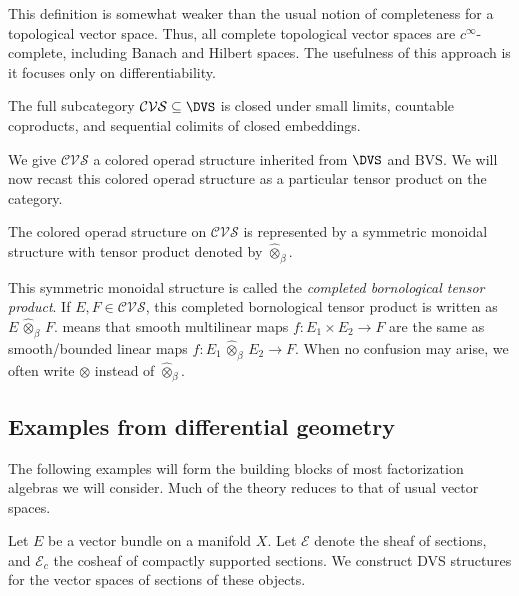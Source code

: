 This definition is somewhat weaker than the usual notion of completeness for a topological vector space. Thus, all complete topological vector spaces are $c^\infty $-complete, including Banach and Hilbert spaces. The usefulness of this approach is it focuses only on differentiability.

\begin{proposition}\label{prp:3-5-16}
	The full subcategory $\mathcal{CVS} \subseteq \DVS $ is closed under small limits, countable coproducts, and sequential colimits of closed embeddings.
\end{proposition}

We give $\mathcal{CVS} $ a colored operad structure inherited from $\DVS $ and $\mathrm{BVS} $. We will now recast this colored operad structure as a particular tensor product on the category.

\begin{theorem}\label{thm:3-5-17}
	The colored operad structure on $\mathcal{CVS} $ is represented by a symmetric monoidal structure with tensor product denoted by $\widehat{\otimes }_{\beta } $.
\end{theorem}

This symmetric monoidal structure is called the \emph{completed bornological tensor product}. If $E,F\in \mathcal{CVS} $, this completed bornological tensor product is written as $E\, \widehat{\otimes }_{\beta } \, F$.  means that smooth multilinear maps $f : E_1\times E_2 \to F$ are the same as smooth/bounded linear maps $f : E_1 \, \widehat{\otimes }_{\beta } \, E_2\to F$. When no confusion may arise, we often write $\otimes $ instead of $\widehat{\otimes } _{\beta } $.

\subsection{Examples from differential geometry}\label{sec:3-5-5}

The following examples will form the building blocks of most factorization algebras we will consider. Much of the theory reduces to that of usual vector spaces.

Let $E$ be a vector bundle on a manifold $X$. Let $\mathcal{E} $ denote the sheaf of sections, and $\mathcal{E} _c$ the cosheaf of compactly supported sections. We construct DVS structures for the vector spaces of sections of these objects.

